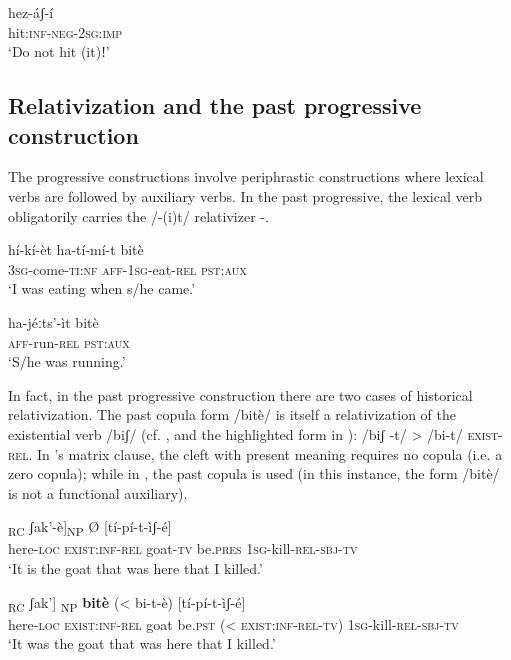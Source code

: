 \documentclass[output=paper]{langsci/langscibook}
\begin{document}
\ea\label{ex:mahland:66}
\gll hez-\'{a}ʃ-\'{i}\\
hit:\textsc{inf-neg-2sg:imp}\\
\glt `Do not hit (it)ǃ'
\z

\subsection{Relativization and the past progressive construction}\label{sec:mahland:3.2}

The progressive constructions involve periphrastic constructions where lexical verbs are followed by auxiliary verbs. In the past progressive, the lexical verb obligatorily carries the /-(i)t/ relativizer -.

\ea\label{ex:mahland:67}
\gll h\'{i}-k\'{i}-\`{e}t                 ha-t\'{i}-m\'{i}-t          bit\`{e}\\
\textsc{3sg}{}-come-\textsc{ti:nf   aff-1sg}{}-eat-\textsc{rel   pst:aux} \\
\glt `I was eating when s/he came.'
\z

\ea\label{ex:mahland:68}
\gll ha-j\'{e}ːts'-\`{i}t    bit\`{e}\\
\textsc{aff}{}-run-\textsc{rel pst:aux}\\
\glt `S/he was running.'
\z

In fact, in the past progressive construction there are two cases of historical relativization. The past copula form /bit\`{e}/ is itself a relativization of the existential verb /biʃ/ (cf. \citealt[318; 461-462]{Ahland2012}, and the highlighted form in ): /biʃ -t/ {\textgreater} /bi-t/ \textsc{exist-rel}. In 's matrix clause, the cleft with present meaning requires no copula (i.e. a zero copula); while in , the past copula is used (in this instance, the form /bit\`{e}/ is not a functional auxiliary). 

\ea\label{ex:mahland:69}
\gll [[n\`{a}-\`{a}t       \textbf{bi-t}]\textsubscript{RC}               ʃak'-\`{e}]\textsubscript{NP} Ø    [t\'{i}-p\'{i}-t-\`{i}ʃ-\'{e}]
\\
here-\textsc{loc}    \textsc{exist}:\textsc{inf-rel}    goat-\textsc{tv  }  be.\textsc{pres}  \textsc{1sg}{}-kill-\textsc{rel-sbj-tv}\\
\glt `It is the goat that was here that I killed.'
\z

\ea\label{ex:mahland:70}
\gll [[n\`{a}-\`{a}t    \textbf{bi-t}]\textsubscript{ RC}             ʃak']\textsubscript{ NP}    \textbf{bit\`{e}}    ({\textless} bi-t-\`{e})      [t\'{i}-p\'{i}-t-\`{i}ʃ-\'{e}]\\
here\textsc{{}-loc   exist:inf-rel}   goat    be.\textsc{pst}  ({\textless} \textsc{exist:inf-rel-tv})  \textsc{1sg}{}-kill-\textsc{rel-sbj-tv}\\
\glt `It was the goat that was here that I killed.'
\z
\end{document}
